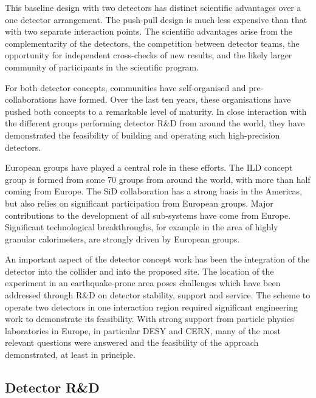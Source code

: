 \documentclass[%
 reprint,
 amsmath,amssymb,
 aps,
]{revtex4-1}
\begin{document}
This baseline design with two detectors
has distinct scientific advantages over a
one detector arrangement.
The push-pull design is much less expensive than 
that with two separate interaction points. 
The scientific advantages arise from the
complementarity of the detectors, the competition between detector
teams, the opportunity for independent cross-checks of new results,
and
 the likely larger community of participants in the scientific program. 

For both detector concepts, communities have self-organised and
pre-collaborations have formed. Over the last ten years, 
 these organisations have pushed both concepts to a remarkable level of
maturity. In close interaction with the different groups
performing detector R\&D from around the world, they have demonstrated the
feasibility of building  and operating such high-precision 
detectors. 

European groups have played a central role in these efforts. The ILD
concept group is formed from some 70 groups from around the world,
with more than half coming from Europe. The SiD collaboration has a
strong basis in the Americas, but also relies on significant
participation from European groups. Major contributions to the
development of all sub-systems have come from Europe. Significant
technological breakthroughs, for example in the area of highly granular
calorimeters, are
 strongly driven by European groups. 

An important aspect of the detector concept work has been
the integration of the detector into the collider and into the
proposed site. The location of the experiment in an earthquake-prone
area poses challenges which have been addressed through R\&D on
detector stability, support and service. The scheme to operate two
detectors in one interaction region required
significant engineering work to demonstrate its
feasibility. With strong support from particle physics laboratories in
Europe, in  particular DESY and CERN, many of the most relevant
questions were answered and the feasibility
 of the approach demonstrated, at least in principle. 


\vspace{-.4cm}


\subsection{\label{sec:detectrd} Detector R\&D}

\vspace{-.3cm}
\end{document}
